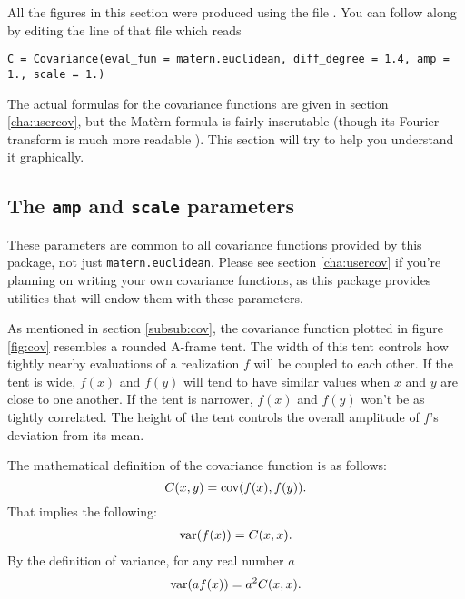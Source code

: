 All the figures in this section were produced using the file . You can follow along by editing the line of that file which reads
\begin{verbatim}
C = Covariance(eval_fun = matern.euclidean, diff_degree = 1.4, amp = 1., scale = 1.)
\end{verbatim}

The actual formulas for the covariance functions are given in section \ref{cha:usercov}, but the Mat\`ern formula is fairly inscrutable (though its Fourier transform is much more readable \cite{stein}). This section will try to help you understand it graphically.

\subsection*{The \texttt{amp} and \texttt{scale} parameters}\label{sub:ampscale}

These parameters are common to all covariance functions provided by this package, not just \texttt{matern.euclidean}. Please see section \ref{cha:usercov} if you're planning on writing your own covariance functions, as this package provides utilities that will endow them with these parameters.

As mentioned in section \ref{subsub:cov}, the covariance function plotted in figure \ref{fig:cov} resembles a rounded A-frame tent. The width of this tent controls how tightly nearby evaluations of a realization $f$ will be coupled to each other. If the tent is wide, $f(x)$ and $f(y)$ will tend to have similar values when $x$ and $y$ are close to one another. If the tent is narrower, $f(x)$ and $f(y)$ won't be as tightly correlated. The height of the tent controls the overall amplitude of $f$'s deviation from its mean.

The mathematical definition of the covariance function is as follows:
\begin{equation}
    \label{covdef}
    C(x,y)=\textup{cov}(f(x), f(y)).
\end{equation}
That implies the following:
\begin{eqnarray*}
    \textup{var}(f(x))=C(x,x).
\end{eqnarray*}
By the definition of variance, for any real number $a$
\begin{eqnarray*}
    \textup{var}( a f(x))=a^2 C(x,x).
\end{eqnarray*}

